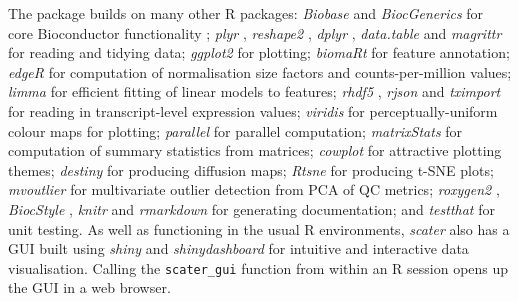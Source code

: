 \documentclass{revtex4}
\begin{document}
The package builds on many other R packages: \emph{Biobase} and \emph{BiocGenerics} for core Bioconductor functionality  \citep{Huber2015-en}; \emph{plyr} \citep{Wickham2015-kj}, \emph{reshape2} \citep{Wickham2012-ec}, \emph{dplyr} \citep{Wickham2015-la}, \emph{data.table} \citep{Dowle2015-zc} and \emph{magrittr} \citep{Bache2014-sa} for reading and
tidying data; \emph{ggplot2} \citep{Wickham2016-dc} for plotting; \emph{biomaRt} \citep{Durinck2005-yz} for feature annotation; \emph{edgeR} \citep{Robinson2010-ky} for computation of normalisation size factors and counts-per-million values; \emph{limma} \citep{Ritchie2015-so} for efficient fitting of linear models to features; \emph{rhdf5} \citep{Fischer2016-me}, \emph{rjson} \citep{Couture-Beil2014-kk} and \emph{tximport} \citep{Soneson2015-fw} for reading in transcript-level expression values;
\emph{viridis} \citep{Garnier2016-hk} for perceptually-uniform colour
maps for plotting; \emph{parallel} for parallel computation; \emph{matrixStats} \citep{Bengtsson2016-tn} for computation of summary statistics from matrices; \emph{cowplot} \citep{Wilke2016-hj} for attractive plotting themes; \emph{destiny} \citep{Angerer2015-sw} for producing diffusion maps; \emph{Rtsne} \citep{Krijthe2015-is} for producing t-SNE plots; \emph{mvoutlier}
\citep{Filzmoser2015-kx} for multivariate outlier detection from PCA of QC metrics; \emph{roxygen2} \citep{Wickham2015-pu}, \emph{BiocStyle} \citep{Huber2015-en}, \emph{knitr} \citep{Xie2013-bn} and \emph{rmarkdown} \citep{Allaire2016-dl} for generating documentation; and \emph{testthat} \citep{Wickham2011-cj} for unit testing. As well as functioning in the usual R environments, \emph{scater} also has a GUI built using
\emph{shiny} \citep{Chang2016-of} and \emph{shinydashboard} \citep{Chang2015-bn} for intuitive and interactive data visualisation. Calling the \verb|scater_gui| function from within an R session opens up the GUI in a web browser.



%
%
%
%
%

\end{document}
